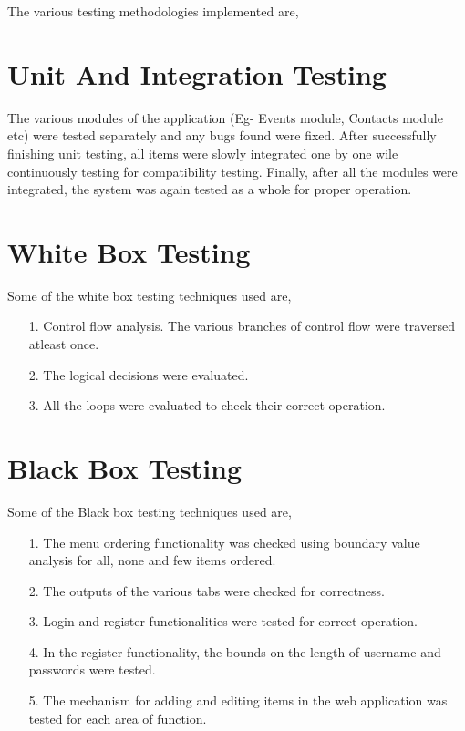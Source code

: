 \newpage
The various testing methodologies implemented are, 

\section{Unit And Integration Testing}
The various modules of the application (Eg- Events module, Contacts module etc) were tested separately and any bugs found were fixed. After successfully finishing unit testing, all items were slowly integrated one by one wile continuously testing for compatibility testing. Finally, after all the modules were integrated, the system was again tested as a whole for proper operation.

\section{White Box Testing}
Some of the white box testing techniques used are,

\begin{itemize}
  \item [1.] Control flow analysis. The various branches of control flow were traversed atleast once.
  \item [2.] The logical decisions were evaluated.
  \item [3.] All the loops were evaluated to check their correct operation.
\end{itemize}

\section{Black Box Testing}
Some of the Black box testing techniques used are,

\begin{itemize}
  \item [1.] The menu ordering functionality was checked using boundary value analysis for all, none and few items ordered.
  \item [2.] The outputs of the various tabs were checked for correctness.
  \item [3.] Login and register functionalities were tested for correct operation.
  \item [4.] In the register functionality, the bounds on the length of username and passwords were tested.
  \item [5.] The mechanism for adding and editing items in the web application was tested for each area of function.

\end{itemize}

